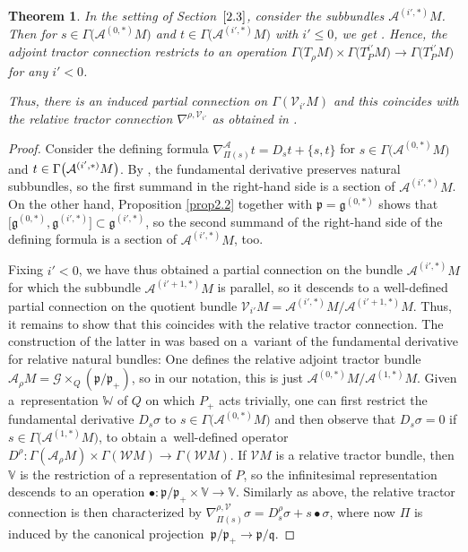 \documentclass[10pt,a4paper]{amsart}
\numberwithin{equation}{section}
\newtheorem{Theorem}{Theorem}[section]
\def\frak{\mathfrak}
\def\Bbb{\mathbb}
\def\Cal{\mathcal}
\newcommand{\x}{\times}
\newcommand{\si}{\sigma}
\newcommand{\Ga}{\Gamma}
\begin{document}
\begin{Theorem}\label{thm3.1}
In the setting of Section~$\ref{2.3}$, consider the subbundles $\Cal A^{(i',*)}M$. Then for
${s\in\Ga\bigl(\Cal A^{(0,*)}M\bigr)}$ and $t\in\Ga\bigl(\Cal A^{(i',*)}M\bigr)$ with $i'\leq 0$, we get
\smash{$\nabla^{\Cal A}_{\Pi(s)}t\in\Ga\big(\Cal A^{(i',*)}\big)M$}. Hence, the adjoint tractor
connection restricts to an operation $\Ga\bigl(T_\rho M\bigr)\x\Ga\bigl(T^{i'}_PM\bigr)\to\Ga\bigl(T^{i'}_PM\bigr)$
for any $i'<0$.

Thus, there is an induced partial connection on $\Ga(\Cal V_{i'}M)$ and this
coincides with the relative tractor connection $\nabla^{\rho,\Cal V_{i'}}$ as
obtained in {\rm \cite[{\it Section} 4.3]{Rel-BGG2}}.
\end{Theorem}
\begin{proof}
Consider the defining formula $\nabla^{\Cal A}_{\Pi(s)}t=D_st+\{s,t\}$ for
$s\in\Ga\bigl(\Cal A^{(0,*)}M\bigr)$ and $t\in\Ga\smash{\bigl(\Cal A^{(i',*)}M\bigr)}$. By \cite[Proposition 1.5.8]{book},
the fundamental derivative preserves natural subbundles, so the first
summand in the right-hand side is a section of $\Cal A^{(i',*)}M$. On the other hand,
Proposition \ref{prop2.2} together with $\frak p=\frak g^{(0,*)}$ shows that $\bigl[\frak
 g^{(0,*)},\frak g^{(i',*)}\bigr]\subset \frak g^{(i',*)}$, so the second summand of the
right-hand side of the defining formula is a section of $\Cal A^{(i',*)}M$, too.

Fixing $i'<0$, we have thus obtained a partial connection on the bundle $\Cal
A^{(i',*)}M$ for which the subbundle $\Cal A^{(i'+1,*)}M$ is parallel, so it descends
to a well-defined partial connection on the quotient bundle $\Cal V_{i'}M=\Cal
A^{(i',*)}M/\Cal A^{(i'+1,*)}M$. Thus, it remains to show that this coincides with the
relative tractor connection. The construction of the latter in \cite{Rel-BGG2} was
based on a~variant of the fundamental derivative for relative natural bundles: One
defines the relative adjoint tractor bundle $\Cal A_\rho M=\Cal G\x_Q(\frak p/\frak
p_+)$, so in our notation, this is just $\Cal A^{(0,*)}M/\Cal A^{(1,*)}M$. Given
a~representation $\Bbb W$ of $Q$ on which $P_+$ acts trivially, one can first restrict
the fundamental derivative $D_s\si$ to $s\in\Ga\bigl(\Cal A^{(0,*)}M\bigr)$ and then observe
that $D_s\si=0$ if $s\in\Ga\bigl(\Cal A^{(1,*)}M\bigr)$, to obtain a~well-defined operator
$D^\rho\colon \Ga(\Cal A_\rho M)\x\Ga(\Cal WM)\to\Ga(\Cal WM)$. If $\Cal VM$ is a relative
tractor bundle, then $\Bbb V$ is the restriction of a representation of $P$, so the
infinitesimal representation descends to an operation $\bullet\colon \frak p/\frak
p_+\x\Bbb V\to\Bbb V$. Similarly as above, the relative tractor connection is then
characterized by $\nabla^{\rho,\Cal V}_{\Pi(s)}\si=D^\rho_s \si+s\bullet\si$, where
now $\Pi$ is induced by the canonical projection~${\frak p/\frak p_+\to\frak p/\frak
q}$.


\end{proof}
\end{document}
